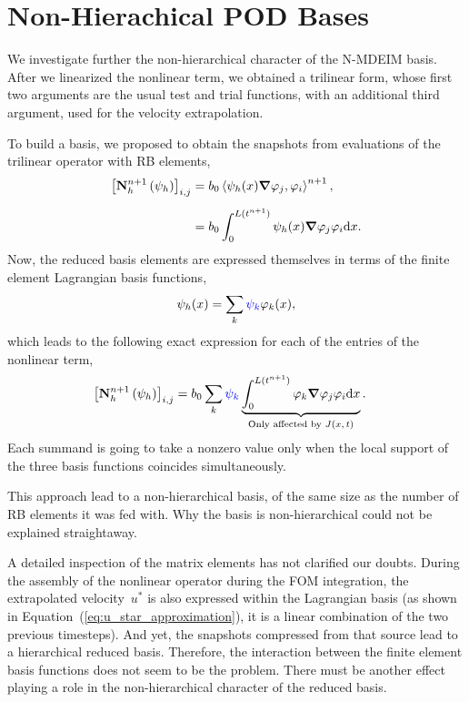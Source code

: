 \documentclass[../../thesis.tex]{subfiles}
\newcommand{\inner}[2]{\left<#1, #2\right>}
\newcommand{\Ah}[1]{\ensuremath{\vb{#1}^{n+1}_h}}
\begin{document}
\section{Non-Hierachical POD Bases}
We investigate further the non-hierarchical character of the N-MDEIM basis.
After we linearized the nonlinear term, we obtained a trilinear form,
whose first two arguments are the usual test and trial functions,
with an additional third argument, used for the velocity extrapolation.

To build a basis, we proposed to obtain the snapshots from evaluations 
of the trilinear operator with RB elements,
\begin{equation}
    \begin{split}
        \qty[\Ah{N}\left(\psi_{h}\right)]_{i,j}
        &= b_0 \inner{\psi_h(x)\grad \varphi_j}{\varphi_i}^{n+1},
        \\[2mm]
        &= b_0 \int_{0}^{L(t^{n+1})} \psi_h(x) \grad \varphi_j \varphi_i \dd x.
    \end{split}
\end{equation}
Now, the reduced basis elements are expressed themselves in terms of 
the finite element Lagrangian basis functions,
\begin{equation}
    \psi_h(x) = \sum_{k} 
    \textcolor{blue}{\psi_k} 
    \varphi_{k}(x),
\end{equation}
which leads to the following exact expression for each of the entries of the nonlinear term,
\begin{equation}
    \begin{split}
        \qty[\Ah{N}\left(\psi_{h}\right)]_{i,j}
        &= b_0 \sum_k 
        \textcolor{blue}{\psi_k} 
        \underbrace{\int_{0}^{L(t^{n+1})} 
        \varphi_{k} \grad \varphi_j \varphi_i \dd x}_{\text{Only affected by $J(x, t)$}}.
    \end{split}
    \label{eq:appendix_exact_representation_triliear_form}
\end{equation}
Each summand is going to take a nonzero value only when the local support of the three
basis functions coincides simultaneously.

This approach lead to a non-hierarchical basis, 
of the same size as the number of RB elements it was fed with.
Why the basis is non-hierarchical could not be explained straightaway.

A detailed inspection of the matrix elements has not clarified our doubts.
During the assembly of the nonlinear operator during the FOM integration, 
the extrapolated velocity~$u^{*}$ is also expressed within the Lagrangian basis
(as shown in Equation~(\ref{eq:u_star_approximation}), 
it is a linear combination of the two previous timesteps).
And yet, the snapshots compressed from that source lead to a hierarchical reduced basis.
Therefore, the interaction between the finite element basis functions
does not seem to be the problem. 
There must be another effect playing a role 
in the non-hierarchical character of the reduced basis.
\end{document}
